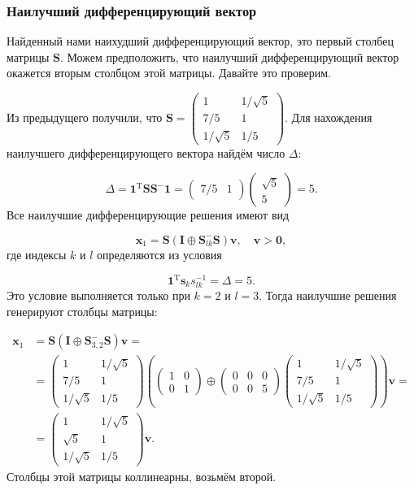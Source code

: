 \documentclass[specialist,
	substylefile = spbu.rtx,
	subf,href,colorlinks=true, 12pt]{disser}
\begin{document}
\subsubsection{Наилучший дифференцирующий вектор}
\label{sec:org896b7a9}
Найденный нами наихудший дифференцирующий вектор, это первый столбец матрицы $\mathbf{S}$. Можем предположить, что наилучший дифференцирующий вектор окажется вторым столбцом этой матрицы. Давайте это проверим.

Из предыдущего получили, что \(\mathbf{S} = \begin{pmatrix}1&1/\sqrt{5}\\7/5&1\\1/\sqrt{5}&1/5\end{pmatrix}\).
Для нахождения наилучшего дифференцирующего вектора найдём число \(\Delta\):

\[
	\Delta = \mathbf{1}^\mathrm{T} \mathbf{S} \mathbf{S}^{-} \mathbf{1} = \begin{pmatrix}7/5&1\end{pmatrix}\begin{pmatrix}\sqrt{5}\\5\end{pmatrix} = 5.
\]
Все наилучшие дифференцирующие решения имеют вид

\[
	\mathbf{x}_{1}=\mathbf{S}\left(\mathbf{I} \oplus \mathbf{S}_{l k}^{-} \mathbf{S}\right) \mathbf{v}, \quad \mathbf{v}>\mathbf{0},
\]
где индексы \(k\) и \(l\) определяются из условия

\[
	\mathbf{1}^\mathrm{T} \mathbf{s}_{k} s_{l k}^{-1}=\Delta = 5.
\]
Это условие выполняется только при \(k=2\) и \(l=3\). Тогда наилучшие решения генерируют столбцы матрицы:

\begin{align*}
	\mathbf{x}_{1} & =\mathbf{S}\left(\mathbf{I} \oplus \mathbf{S}_{3,2}^{-} \mathbf{S}\right) \mathbf{v} = \\ 
	&= \begin{pmatrix}1&1/\sqrt{5}\\7/5&1\\1/\sqrt{5}&1/5\end{pmatrix} \left( \begin{pmatrix}1&0\\0&1\end{pmatrix} \oplus \begin{pmatrix}0&0&0\\0&0&5\end{pmatrix}\begin{pmatrix}1&  1/\sqrt{5}\\7/5&1\\1/\sqrt{5}&1/5\end{pmatrix} \right)\mathbf{v} = \\
	                   & = \begin{pmatrix}1&1/\sqrt{5}\\\sqrt{5}&1\\1/\sqrt{5}&1/5\end{pmatrix}\mathbf{v}.
\end{align*}
Столбцы этой матрицы коллинеарны, возьмём второй.
\end{document}
